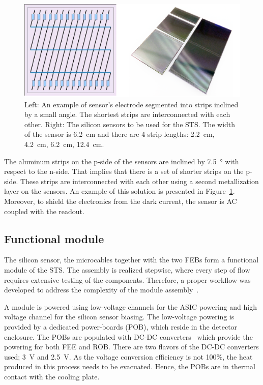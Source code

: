 \begin{figure}[!h]
\centering
\includegraphics[width=0.75\columnwidth]{Chapter2/images/silicon_sensors.png}
\caption{Left: An example of sensor's electrode segmented into strips inclined by a small angle. The shortest strips are interconnected with each other. Right: The silicon sensors to be used for the \gls{STS}. The width of the sensor is \SI{6.2}{\centi\metre} and there are 4 strip lengths: \SI{2.2}{\centi\metre}, \SI{4.2}{\centi\metre}, \SI{6.2}{\centi\metre}, \SI{12.4}{\centi\metre}.}
\label{fig_sts_si}
\end{figure}

The aluminum strips on the p-side of the sensors are inclined by \SI{7.5}{\degree} with respect to the n-side. That implies that there is a set of shorter strips on the p-side. These strips are interconnected with each other using a second metallization layer on the sensors. An example of this solution is presented in Figure~\ref{fig_sts_si}. Moreover, to shield the electronics from the dark current, the sensor is AC coupled with the readout.
\subsection{Functional module}
\label{sts_module}
The silicon sensor, the microcables together with the two \glspl{FEB} form a functional module of the \gls{STS}. The assembly is realized stepwise, where every step of flow requires extensive testing of the components. Therefore, a proper workflow was developed to address the complexity of the module assembly~\cite{carmen2}. 

A module is powered using low-voltage channels for the ASIC powering and high voltage channel for the silicon sensor biasing. The low-voltage powering is provided by a dedicated power-boards (\gls{POB}), which reside in the detector enclosure. The \glspl{POB} are populated with DC-DC converters~\cite{DC_DC_converter} which provide the powering for both \gls{FEE} and \gls{ROB}. There are two flavors of the DC-DC converters used; 3~V and 2.5~V. As the voltage conversion efficiency is not 100\%, the heat produced in this process needs to be evacuated. Hence, the \glspl{POB} are in thermal contact with the cooling plate. 

